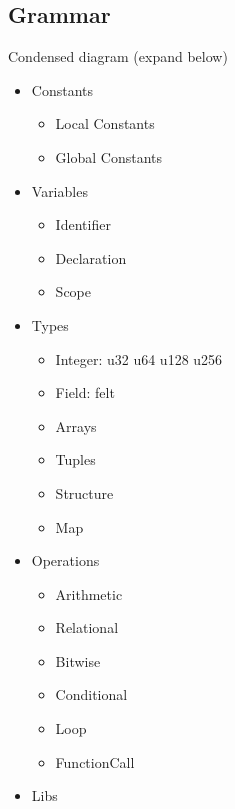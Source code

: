 \subsection{Grammar}\label{section: grammar}

Condensed diagram (expand below)

\begin{itemize}
    \item Constants
    \begin{itemize}
        \item Local Constants
        \item Global Constants
    \end{itemize}
    \item Variables
        \begin{itemize}
            \item Identifier
            \item Declaration
            \item Scope
        \end{itemize}
    \item Types
        \begin{itemize}
            \item Integer: u32 u64 u128 u256
            \item Field: felt
            \item Arrays
            \item Tuples
            \item Structure
            \item Map
        \end{itemize}
    \item Operations
        \begin{itemize}
            \item Arithmetic
            \item Relational
            \item Bitwise
            \item Conditional
            \item Loop
            \item FunctionCall
        \end{itemize}
    \item Libs
\end{itemize}